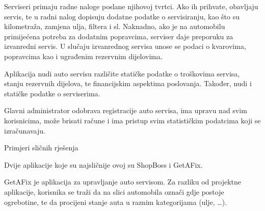 		Serviseri primaju radne naloge poslane njihovoj tvrtci. 
		Ako ih prihvate, obavljaju servis, te u radni nalog dopisuju dodatne podatke o servisiranju, kao što su kilometraža, zamjena ulja, filtera i sl. Naknadno, ako je na automobilu primijećena potreba za dodatnim popravcima, serviser daje preporuku za izvanredni servis. U slučaju izvanrednog servisa unose se podaci o kvarovima, popravcima kao i ugrađenim rezervnim dijelovima.

		Aplikacija nudi auto servisu različite statičke podatke o troškovima servisa, stanju rezervnih dijelova, te financijskim aspektima poslovanja. Također, nudi i statičke podatke o serviserima.
		
		Glavni administrator odobrava registracije auto servisa, ima upravu nad svim korisnicima, može brisati račune i ima pristup svim statističkim podatcima koji se izračunavaju. 
		
		
		\newpage
		\Large Primjeri sličnih rješenja
		
		\normalsize Dvije aplikacije koje su najsličnije ovoj su ShopBoss i GetAFix. 
		
		GetAFix je aplikacija za upravljanje auto servisom. Za razliku od projektne aplikacije, korisnika se traži da na slici automobila označi gdje postoje ogrebotine, te da procijeni stanje auta u raznim kategorijama (ulje, \ldots).
		
